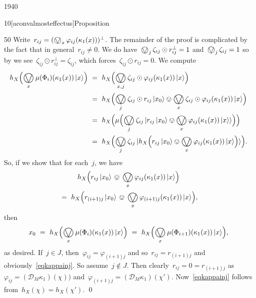 \begin{parsec}{1940}
\begin{point}{10}[aconvalmosteffectus]{Proposition}
\begin{point}{50}
Write~$r_{ij} = (\bigovee_x \varphi_{ij}(\kappa_1(x)))^\perp$.
The remainder of the proof is complicated
    by the fact that in general~$r_{ij} \neq 0$.
    We do have~$\bigovee_j \zeta_{ij} \odot r^\perp_{ij} = 1$
        and~$\bigovee_j \zeta_{ij} = 1$
        so by 
        we see~$\zeta_{ij} \odot r^\perp_{ij} = \zeta_{ij}$,
        which  forces~$\zeta_{ij} \odot r_{ij} = 0$.
We compute
\begin{align*}
    h_X\Bigl(\bigovee_x \mu(\Phi_i) (\kappa_1(x)) \ket{x}\Bigr) 
    &\ = \ 
    h_X \Bigl( \bigovee_{x,j} \zeta_{ij} \odot \varphi_{ij}
        (\kappa_1(x)) \ket{x} \Bigr) \\
        &\ = \ 
    h_X \Bigl(
    \bigovee_{j} \zeta_{ij} \odot r_{ij} \ket{x_0} \ovee \bigovee_x
    \zeta_{ij} \odot \varphi_{ij}
        (\kappa_1(x)) \ket{x} \Bigr) \\
        & \ = \ h_X \Bigl(
    \mu\Bigl( \bigovee_j \zeta_{ij} \ket{
        r_{ij} \ket{x_0} \ovee \bigovee_x \varphi_{ij} (\kappa_1 (x)) \ket{x}
    }
    \Bigr)
    \Bigr) \\
        & \ = \ h_X \Bigl(
    \bigovee_j \zeta_{ij} \ket{
        h_X\Bigl(
        r_{ij} \ket{x_0} \ovee \bigovee_x \varphi_{ij} (\kappa_1 (x)) \ket{x}
    \Bigr)
}
    \Bigr).
\end{align*}
So, if we show that for each~$j$,
    we have
\begin{multline}\label{eqkappainj}
        h_X\Bigl(
        r_{ij} \ket{x_0} \, \ovee \,\bigovee_x \varphi_{ij} (\kappa_1 (x)) \ket{x}
    \Bigr) \\
    \  = \  
        h_X\Bigl(
        r_{(i+1)j} \ket{x_0} \,\ovee \,\bigovee_x \varphi_{(i+1)j} (\kappa_1 (x)) \ket{x}
    \Bigr),
\end{multline}
then
\begin{equation*}
    x_0 \ = \ h_X\Bigl(\bigovee_x \mu(\Phi_i) (\kappa_1(x)) \ket{x}\Bigr) 
    \ =\  h_X\Bigl(\bigovee_x \mu(\Phi_{i+1}) (\kappa_1(x)) \ket{x}\Bigr),
\end{equation*}
as desired.
If~$j \in J$,
then~$\varphi_{ij} = \varphi_{(i+1)j}$
and so~$r_{ij} = r_{(i+1)j}$
and obviously~\eqref{eqkappainj}.
So assume~$j \notin J$.
Then clearly~$r_{ij} = 0 = r_{(i+1)j}$
as~$\varphi_{ij} = (\mathcal{D}_M \kappa_1)(\chi))$
    and~$\varphi_{(i+1)j} = (\mathcal{D}_M \kappa_1) (\chi')$.
Now~\eqref{eqkappainj} follows from~$h_X(\chi) = h_X(\chi')$. \qed
\end{point}
\end{point}
\end{parsec}

